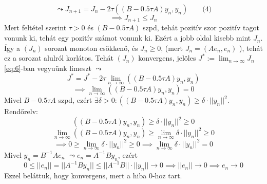 \begin{equation}\label{eq:6}
    \leadsto J_{n+1} = J_{n} - 2\tau((B - 0.5\tau A)y_{n}, y_{n}) \qquad \text{(4)}
\end{equation}
\begin{equation*}
    \implies J_{n+1} \leq J_{n}
\end{equation*}
Mert feltétel szerint $\tau > 0$ és $(B - 0.5 \tau A)$ szpd, tehát pozitív szor pozitív tagot vonunk ki, tehát egy pozitív számot vonunk ki. Ezért a jobb oldal kisebb mint $J_{n}$.
Így a $(J_{n})$ sorozat monoton csökkenő, és $J_{n} \geq 0$, (mert $J_{n} = (Ae_{n}, e_{n})$ ), tehát ez a sorozat alulról korlátos.
Tehát $(J_{n})$ konvergens, jelöles $J^{*} := \lim_{ n \to \infty }J_{n}$ \\
\ref{eq:6}-ban vegyuünk limeszt $\leadsto$
\begin{equation*}
    J^{*} = J^{*} - 2\tau \lim_{ n \to \infty } ((B - 0.5 \tau A)y_{n}, y_{n})
\end{equation*}
\begin{equation*}
    \implies \lim_{ n \to \infty } ((B - 0.5 \tau A)y_{n}, y_{n}) = 0
\end{equation*}
Mivel $B - 0.5\tau A$ szpd, ezért $\exists \delta > 0: ((B - 0.5 \tau A)y_{n}, y_{n}) \geq \delta \cdot \lvert\lvert y_{n} \rvert\rvert^{2}$.
Rendőrelv:
\begin{equation*}
    ((B - 0.5 \tau A)y_{n}, y_{n}) \geq \delta \cdot \lvert\lvert y_{n} \rvert\rvert^{2} \geq 0
\end{equation*}
\begin{equation*}
    \lim_{ n \to \infty } ((B - 0.5 \tau A)y_{n}, y_{n}) \geq \lim_{ n \to \infty }  \delta \cdot \lvert\lvert y_{n} \rvert\rvert^{2} \geq 0
\end{equation*}
\begin{equation*}
    \implies 0 \geq \lim_{ n \to \infty } \delta \cdot \lvert\lvert y_{n} \rvert\rvert ^{2} \geq 0 \implies \lim_{ n \to \infty } \delta \cdot \lvert\lvert y_{n} \rvert\rvert ^{2} = 0
\end{equation*}
Mivel $y_{n} = B^{-1}Ae_{n}$ $\leadsto e_{n} = A^{-1}By_{n}$, ezért
\begin{equation*}
    0 \leq \lvert\lvert e_{n} \rvert\rvert = \lvert\lvert A^{-1}By_{n} \rvert\rvert \leq \lvert\lvert A^{-1}B \rvert\rvert  \cdot \lvert\lvert y_{n} \rvert\rvert \to 0 \implies \lvert\lvert e_{n} \rvert\rvert \to 0 \implies e_{n} \to 0
\end{equation*}
Ezzel beláttuk, hogy konvergens, mert a hiba $0$-hoz tart.

